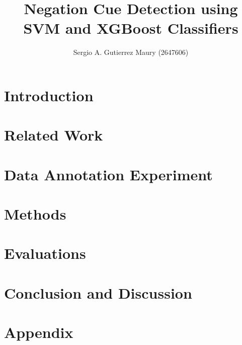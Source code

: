 \documentclass[runningheads]{llncs}
\begin{document}
%
\title{Negation Cue Detection using SVM and XGBoost Classifiers}
%
%
\author{
Sergio A. Gutierrez Maury (2647606)
}
%
%
%
\maketitle              %

\begin{abstract}

\end{abstract}


\section*{Introduction}

\section*{Related Work}

\section*{Data Annotation Experiment}

\section*{Methods}
% 
\section*{Evaluations}
% 
\section*{Conclusion and Discussion}
% 
\newpage
\printbibliography


\appendix
\section{Appendix}
\end{document}
